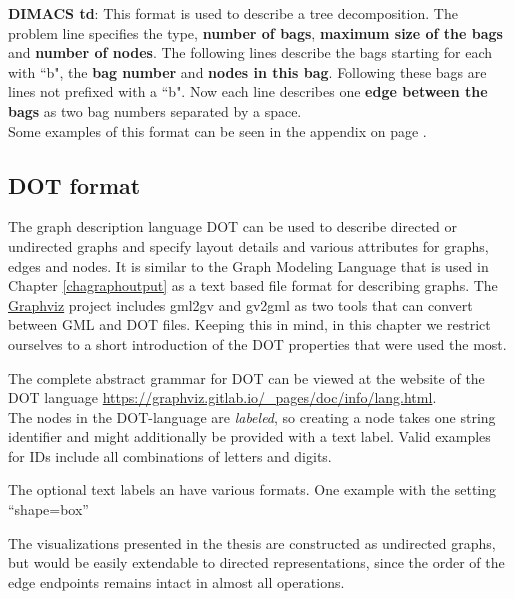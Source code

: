 \documentclass[a4paper, 12pt, bibliography=totoc]{scrartcl}
\begin{document}
\textbf{DIMACS td}: This format is used to describe a tree decomposition. The problem line specifies the type, \textbf{number of bags}, \textbf{maximum size of the bags} and \textbf{number of nodes}. The following lines describe the bags starting for each with ``b", the \textbf{bag number} and \textbf{nodes in this bag}. Following these bags are lines not prefixed with a ``b". Now each line describes one \textbf{edge between the bags} as two bag numbers separated by a space.\\


Some examples of this format can be seen in the appendix on page \pageref{app:input}.

\subsection{DOT format}
The graph description language DOT can be used to describe directed or undirected graphs and specify layout details and various attributes for graphs, edges and nodes. It is similar to the Graph Modeling Language that is used in Chapter \ref{chagraphoutput} as a text based file format for describing graphs. The \href{https://graphviz.org/}{Graphviz} project includes gml2gv and gv2gml as two tools that can convert between GML and DOT files. Keeping this in mind, in this chapter we restrict ourselves to a short introduction of the DOT properties that were used the most.



The complete abstract grammar for DOT can be viewed at the website of the DOT language \url{https://graphviz.gitlab.io/_pages/doc/info/lang.html}.\\


The nodes in the DOT-language are \emph{labeled}, so creating a node takes one string identifier and might additionally be provided with a text label. Valid examples for IDs include all combinations of letters and digits.

The optional text labels an have various formats. One example with the setting ``shape=box''

The visualizations presented in the thesis are constructed as undirected graphs, but would be easily extendable to directed representations, since the order of the edge endpoints remains intact in almost all operations.
\end{document}
